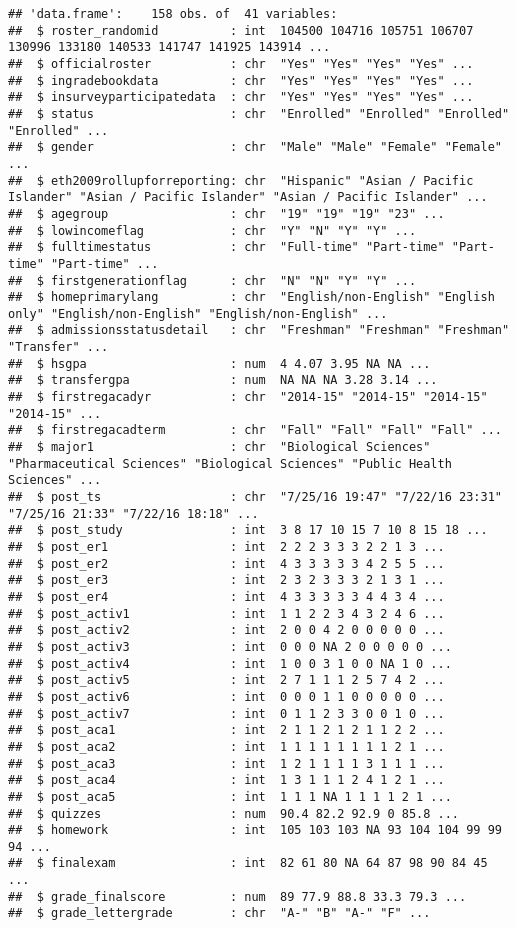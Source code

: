 \documentclass[
]{book}
\begin{document}
\begin{verbatim}
## 'data.frame':    158 obs. of  41 variables:
##  $ roster_randomid          : int  104500 104716 105751 106707 130996 133180 140533 141747 141925 143914 ...
##  $ officialroster           : chr  "Yes" "Yes" "Yes" "Yes" ...
##  $ ingradebookdata          : chr  "Yes" "Yes" "Yes" "Yes" ...
##  $ insurveyparticipatedata  : chr  "Yes" "Yes" "Yes" "Yes" ...
##  $ status                   : chr  "Enrolled" "Enrolled" "Enrolled" "Enrolled" ...
##  $ gender                   : chr  "Male" "Male" "Female" "Female" ...
##  $ eth2009rollupforreporting: chr  "Hispanic" "Asian / Pacific Islander" "Asian / Pacific Islander" "Asian / Pacific Islander" ...
##  $ agegroup                 : chr  "19" "19" "19" "23" ...
##  $ lowincomeflag            : chr  "Y" "N" "Y" "Y" ...
##  $ fulltimestatus           : chr  "Full-time" "Part-time" "Part-time" "Part-time" ...
##  $ firstgenerationflag      : chr  "N" "N" "Y" "Y" ...
##  $ homeprimarylang          : chr  "English/non-English" "English only" "English/non-English" "English/non-English" ...
##  $ admissionsstatusdetail   : chr  "Freshman" "Freshman" "Freshman" "Transfer" ...
##  $ hsgpa                    : num  4 4.07 3.95 NA NA ...
##  $ transfergpa              : num  NA NA NA 3.28 3.14 ...
##  $ firstregacadyr           : chr  "2014-15" "2014-15" "2014-15" "2014-15" ...
##  $ firstregacadterm         : chr  "Fall" "Fall" "Fall" "Fall" ...
##  $ major1                   : chr  "Biological Sciences" "Pharmaceutical Sciences" "Biological Sciences" "Public Health Sciences" ...
##  $ post_ts                  : chr  "7/25/16 19:47" "7/22/16 23:31" "7/25/16 21:33" "7/22/16 18:18" ...
##  $ post_study               : int  3 8 17 10 15 7 10 8 15 18 ...
##  $ post_er1                 : int  2 2 2 3 3 3 2 2 1 3 ...
##  $ post_er2                 : int  4 3 3 3 3 3 4 2 5 5 ...
##  $ post_er3                 : int  2 3 2 3 3 3 2 1 3 1 ...
##  $ post_er4                 : int  4 3 3 3 3 3 4 4 3 4 ...
##  $ post_activ1              : int  1 1 2 2 3 4 3 2 4 6 ...
##  $ post_activ2              : int  2 0 0 4 2 0 0 0 0 0 ...
##  $ post_activ3              : int  0 0 0 NA 2 0 0 0 0 0 ...
##  $ post_activ4              : int  1 0 0 3 1 0 0 NA 1 0 ...
##  $ post_activ5              : int  2 7 1 1 1 2 5 7 4 2 ...
##  $ post_activ6              : int  0 0 0 1 1 0 0 0 0 0 ...
##  $ post_activ7              : int  0 1 1 2 3 3 0 0 1 0 ...
##  $ post_aca1                : int  2 1 1 2 1 2 1 1 2 2 ...
##  $ post_aca2                : int  1 1 1 1 1 1 1 1 2 1 ...
##  $ post_aca3                : int  1 2 1 1 1 1 3 1 1 1 ...
##  $ post_aca4                : int  1 3 1 1 1 2 4 1 2 1 ...
##  $ post_aca5                : int  1 1 1 NA 1 1 1 1 2 1 ...
##  $ quizzes                  : num  90.4 82.2 92.9 0 85.8 ...
##  $ homework                 : int  105 103 103 NA 93 104 104 99 99 94 ...
##  $ finalexam                : int  82 61 80 NA 64 87 98 90 84 45 ...
##  $ grade_finalscore         : num  89 77.9 88.8 33.3 79.3 ...
##  $ grade_lettergrade        : chr  "A-" "B" "A-" "F" ...
\end{verbatim}
\end{document}
